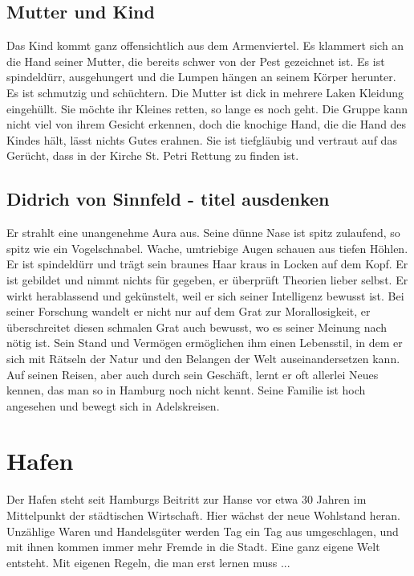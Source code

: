 \subsection{Mutter und Kind}

Das Kind kommt ganz offensichtlich aus dem Armenviertel. Es klammert sich an die Hand seiner Mutter, die bereits schwer von der Pest gezeichnet ist. Es ist spindeldürr, ausgehungert und die Lumpen hängen an seinem Körper herunter. Es ist schmutzig und schüchtern. Die Mutter ist dick in mehrere Laken Kleidung eingehüllt. Sie möchte ihr Kleines retten, so lange es noch geht. Die Gruppe kann nicht viel von ihrem Gesicht erkennen, doch die knochige Hand, die die Hand des Kindes hält, lässt nichts Gutes erahnen. Sie ist tiefgläubig und vertraut auf das Gerücht, dass in der Kirche St. Petri Rettung zu finden ist.

\subsection{Didrich von Sinnfeld - titel ausdenken}

Er strahlt eine unangenehme Aura aus. Seine dünne Nase ist spitz zulaufend, so spitz wie ein Vogelschnabel. Wache, umtriebige Augen schauen aus tiefen Höhlen. Er ist spindeldürr und trägt sein braunes Haar kraus in Locken auf dem Kopf. Er ist gebildet und nimmt nichts für gegeben, er überprüft Theorien lieber selbst. Er wirkt herablassend und gekünstelt, weil er sich seiner Intelligenz bewusst ist. Bei seiner Forschung wandelt er nicht nur auf dem Grat zur Morallosigkeit, er überschreitet diesen schmalen Grat auch bewusst, wo es seiner Meinung nach nötig ist. Sein Stand und Vermögen ermöglichen ihm einen Lebensstil, in dem er sich mit Rätseln der Natur und den Belangen der Welt auseinandersetzen kann. Auf seinen Reisen, aber auch durch sein Geschäft, lernt er oft allerlei Neues kennen, das man so in Hamburg noch nicht kennt. Seine Familie ist hoch angesehen und bewegt sich in Adelskreisen.



\section{Hafen}

Der Hafen steht seit Hamburgs Beitritt zur Hanse vor etwa 30 Jahren im Mittelpunkt der städtischen Wirtschaft. Hier wächst der neue Wohlstand heran. Unzählige Waren und Handelsgüter werden Tag ein Tag aus umgeschlagen, und mit ihnen kommen immer mehr Fremde in die Stadt. Eine ganz eigene Welt entsteht. Mit eigenen Regeln, die man erst lernen muss ...

